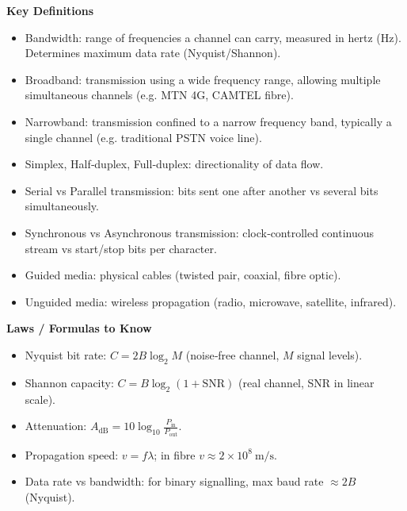\documentclass[11pt]{article}
\newcommand{\cle}[1]{{\popxbold\color{popdark}#1}}
\begin{document}
\begin{bilan}
\textbf{Key Definitions}
\begin{itemize}
  \item \cle{Bandwidth}: range of frequencies a channel can carry, measured in hertz (Hz). Determines maximum data rate (Nyquist/Shannon).
  \item \cle{Broadband}: transmission using a wide frequency range, allowing multiple simultaneous channels (e.g. MTN 4G, CAMTEL fibre).
  \item \cle{Narrowband}: transmission confined to a narrow frequency band, typically a single channel (e.g. traditional PSTN voice line).
  \item \cle{Simplex}, \cle{Half‑duplex}, \cle{Full‑duplex}: directionality of data flow.
  \item \cle{Serial} vs \cle{Parallel} transmission: bits sent one after another vs several bits simultaneously.
  \item \cle{Synchronous} vs \cle{Asynchronous} transmission: clock‑controlled continuous stream vs start/stop bits per character.
  \item \cle{Guided media}: physical cables (twisted pair, coaxial, fibre optic).
  \item \cle{Unguided media}: wireless propagation (radio, microwave, satellite, infrared).
\end{itemize}

\textbf{Laws / Formulas to Know}
\begin{itemize}
  \item \cle{Nyquist bit rate}: $C = 2B\log_2 M$ (noise‑free channel, $M$ signal levels).
  \item \cle{Shannon capacity}: $C = B\log_2(1+\mathrm{SNR})$ (real channel, SNR in linear scale).
  \item \cle{Attenuation}: $A_{\mathrm{dB}} = 10\log_{10}\frac{P_{\text{in}}}{P_{\text{out}}}$.
  \item \cle{Propagation speed}: $v = f\lambda$; in fibre $v \approx 2\times10^8\ \mathrm{m/s}$.
  \item \cle{Data rate vs bandwidth}: for binary signalling, max baud rate $\approx 2B$ (Nyquist).
\end{itemize}


\end{bilan}
\end{document}

